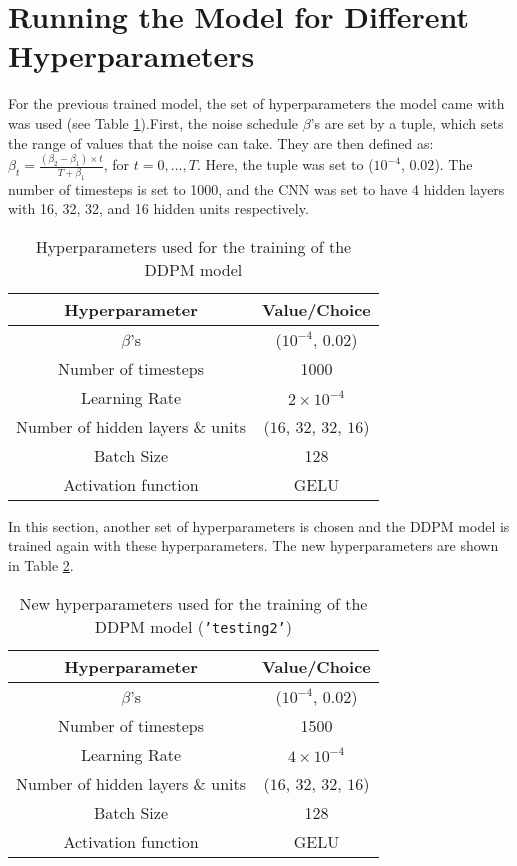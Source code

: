 \documentclass[12pt]{report} %
\begin{document}
\section{Running the Model for Different Hyperparameters}

For the previous trained model, the set of hyperparameters the model came with was used (see Table \ref{tab:hyperparams}).First, the noise schedule $\beta$'s are set by a tuple, which sets the range of values that the noise can take. They are then defined as: $\beta_{t} = \frac{(\beta_{2}-\beta_{1}) \times t}{T + \beta_{1}} $, for $t = 0, \dots, T$. Here, the tuple was set to ($10^{-4}$, $0.02$). The number of timesteps is set to 1000, and the CNN was set to have 4 hidden layers with 16, 32, 32, and 16 hidden units respectively.

\begin{table}[h]
  \centering
  \begin{tabular}{c c}
    \hline
    Hyperparameter & Value/Choice \\
    \hline
    $\beta$'s & ($10^{-4}$, $0.02$) \\
    Number of timesteps & 1000 \\
    Learning Rate & $2 \times 10^{-4}$ \\
    Number of hidden layers \& units & ($16$, $32$, $32$, $16$) \\
    Batch Size & 128 \\
    Activation function & GELU \\
    \hline
  \end{tabular}
  \captionsetup{font=footnotesize}
  \caption{Hyperparameters used for the training of the DDPM model}
  \label{tab:hyperparams}
\end{table}

In this section, another set of hyperparameters is chosen and the DDPM model is trained again with these hyperparameters. The new hyperparameters are shown in Table \ref{tab:hyperparams2}.

\begin{table}[h]
  \centering
  \begin{tabular}{c c}
    \hline
    Hyperparameter & Value/Choice \\
    \hline
    $\beta$'s & ($10^{-4}$, $0.02$) \\
    Number of timesteps & 1500 \\
    Learning Rate & $4 \times 10^{-4}$ \\
    Number of hidden layers \& units & ($16$, $32$, $32$, $16$) \\
    Batch Size & 128 \\
    Activation function & GELU \\
    \hline
  \end{tabular}
  \captionsetup{font=footnotesize}
  \caption{New hyperparameters used for the training of the DDPM model (\texttt{'testing2'})}
  \label{tab:hyperparams2}
\end{table}
\end{document}
